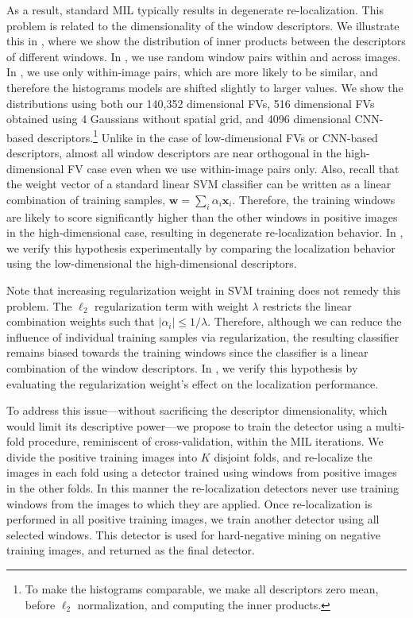 \documentclass[10pt,journal,cspaper,final,twocolumn,compsoc]{./IEEEtran}
\begin{document}
As a result, standard MIL typically results in degenerate
re-localization. This problem is related to the
dimensionality of the window descriptors.  We illustrate
this in , where we show the distribution
of inner products between the descriptors of different
windows.  In , we use random
window pairs within and across images. In
, we use only within-image pairs,
which are more likely to be similar, and therefore the
histograms models are shifted slightly to larger values.
We show the distributions using both our 140,352
dimensional FVs, 516 dimensional FVs obtained using 4
Gaussians without spatial grid, and 4096 dimensional
CNN-based descriptors.\footnote{To make the histograms comparable, we make all descriptors zero mean, before $\ell_2$ normalization, and computing the inner products.}
Unlike in the case of
low-dimensional FVs or CNN-based descriptors, almost all
window descriptors are near orthogonal in the
high-dimensional FV case even when we use within-image
pairs only. Also, recall that the weight vector of a
standard linear SVM classifier can be written as a linear
combination of training samples, $\bm w=\sum_i \alpha_i
\bm x_i$.  Therefore, the training windows are likely to
score significantly higher than the other windows in
positive images in the high-dimensional case, resulting in
degenerate re-localization behavior. In
, we verify this hypothesis
experimentally by comparing the localization behavior
using the low-dimensional \vs the high-dimensional
descriptors. 

Note that increasing regularization weight in SVM training does not remedy this problem. The
$\ell_2$ regularization term with weight $\lambda$
restricts the linear combination weights such that
$|\alpha_i|\leq{1/\lambda}$.  Therefore, although we can
reduce the influence of individual training samples via
regularization, the resulting classifier remains biased
towards the training windows since the classifier is a
linear combination of the window descriptors. In
, we verify this hypothesis 
by evaluating the regularization weight's effect on the
localization performance.

To address this issue---without sacrificing the descriptor 
dimensionality, which would limit its descriptive power---we propose
to train the detector using a multi-fold 
procedure, reminiscent of cross-validation, within the MIL
iterations.  We divide the positive training images into
$K$ disjoint folds, and re-localize the images in each
fold using a detector trained using windows from positive
images in the other folds.  In this manner the
re-localization detectors never use training windows from
the images to which they are applied.  Once
re-localization is performed in all positive training
images, we train another detector using all selected
windows. This detector is used for hard-negative mining on
negative training images, and returned as the final
detector.
\end{document}
